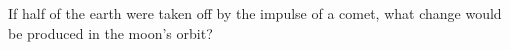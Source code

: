 If half of the earth were taken off by the impulse 
of a comet, what change would be produced in the 
moon's orbit?
